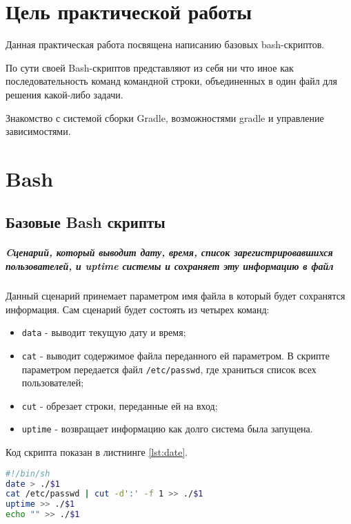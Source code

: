 \graphicspath{{./img}}
\chapter*{\LARGE{Цель практической работы}}
Данная практическая работа посвящена написанию базовых bash-скриптов.\par
По сути своей Bash-скриптов представляют из себя ни что иное как
последовательность команд командной строки, объединенных в один файл
для решения какой-либо задачи.\par
Знакомство с системой сборки Gradle, возможностями gradle и
управление зависимостями.

\chapter{Bash}
\section{Базовые Bash скрипты}
\paragraph{Cценарий, который выводит дату, время, список
зарегистрировавшихся пользователей, и uptime системы и сохраняет
эту информацию в файл}\mbox{}\par
Данный сценарий принемает параметром имя файла в который будет сохранятся
информация. Сам сценарий будет состоять из четырех команд:
\begin{itemize}
	\item \texttt{data} - выводит текущую дату и время;
	\item \texttt{cat} - выводит содержимое файла переданного ей параметром.
		В скрипте параметром передается файл \texttt{/etc/passwd},
		где храниться список всех пользователей;
	\item \texttt{cut} - обрезает строки, переданные ей на вход;
	\item \texttt{uptime} - возвращает информацию как долго система
		была запущена.
\end{itemize}
Код скрипта показан в листнинге \ref{lst:date}.

\begin{lstlisting}[language=Bash
	, caption=\leftline{Код скрипта}
	, label=lst:date]
#!/bin/sh
date > ./$1
cat /etc/passwd | cut -d':' -f 1 >> ./$1
uptime >> ./$1
echo "" >> ./$1
\end{lstlisting}

